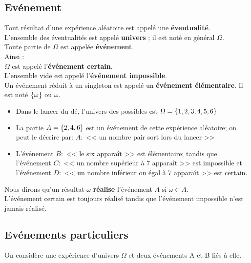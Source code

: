 \subsection*{Evénement}

\begin{definition}
Tout résultat d’une expérience aléatoire est appelé une \textbf{ éventualité}. \\
L’ensemble des éventualités est appelé \textbf{univers} ; il est noté en général $ \Omega $. \\
Toute partie de $ \Omega $ est appelée \textbf{ événement}.\\
Ainsi :\\
$ \Omega $ est appelé l’\textbf{événement certain.}\\
L’ensemble vide est appelé l’\textbf{événement impossible}.\\
Un événement réduit à un singleton est appelé un \textbf{événement élémentaire}. Il est noté $ \left\{\omega\right\} $  ou $ \omega $.

\end{definition}

\begin{example}
\begin{itemize}
\item Dans le lancer du dé, l'univers des possibles est $ \Omega =\left\{1,2,3,4,5,6\right\} $ 
\item La partie $ A=\left\{2,4,6\right\} $ est un événement de cette expérience aléatoire; on peut le décrire par: $ A :$  << un nombre pair sort lors du lancer >>
\item  L'événement $ B: $  << le six apparaît >> est élémentaire; tandis que l'événement $ C: $  << un nombre       supérieur à 7 apparaît >> est impossible  et l'événement $ D: $  << un nombre inférieur ou égal à 7 apparaît >> est certain.
\end{itemize}
\end{example}
\begin{remark}
Nous dirons qu'un résultat $ \omega $  \textbf{réalise} l'événement $ A $ si  $ \omega\in A. $\\
L'événement certain est toujours réalisé tandis que l'événement impossible n'est jamais réalisé.
\end{remark}
\subsection*{Evénements particuliers}
On considère une expérience d’univers  $ \Omega $ et deux événements A et B liés à elle.


